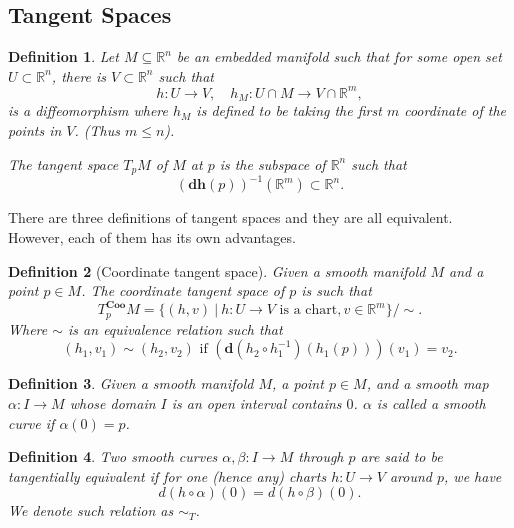 \documentclass{article}
\newtheorem{definition}{Definition}[section]
\numberwithin{equation}{section}
\begin{document}
\subsection{Tangent Spaces}

\begin{definition}
Let $M\subseteq \mathbb{R}^n$ be an embedded manifold such that for some open set $U\subset\mathbb{R}^n$, there is $V\subset\mathbb{R}^n$ such that
\begin{equation*}
h:U\to V, \quad h_M:U\cap M\to V\cap \mathbb{R}^m,
\end{equation*}
is a diffeomorphism where $h_M$ is defined to be taking the first $m$ coordinate of the points in $V$. (Thus $m\leq n$).\\
\par The tangent space $T_pM$ of $M$ at $p$ is the subspace of $\mathbb{R}^n$ such that
\begin{equation*}
(\mathbf{dh}(p))^{-1}(\mathbb{R}^m)\subset\mathbb{R}^n.
\end{equation*}
\end{definition}

There are three definitions of tangent spaces and they are all equivalent. However, each of them has its own advantages. 

\begin{definition}[Coordinate tangent space]
Given a smooth manifold $M$ and a point $p\in M$. The coordinate tangent space of $p$ is such that
\begin{equation*}
T_p^{\mathbf{Coo}}M = \{(h,v)\:|\: h:U\to V\text{ is a chart}, v\in\mathbb{R}^m\}/\sim.
\end{equation*}
Where $\sim$ is an equivalence relation such that
\begin{equation*}
(h_1,v_1)\sim (h_2,v_2)\text{ if } (\mathbf{d}(h_2\circ h_1^{-1})(h_1(p)))(v_1) = v_2.
\end{equation*}
\end{definition}

\begin{definition}
Given a smooth manifold $M$, a point $p\in M$, and a smooth map $\alpha:I\to M$ whose domain $I$ is an open interval contains $0$. $\alpha$ is called a smooth curve if $\alpha(0)=p$.
\end{definition}

\begin{definition}
Two smooth curves $\alpha,\beta:I\to M$ through $p$ are said to be tangentially equivalent if for one (hence any) charts $h:U\to V$ around $p$, we have 
\begin{equation*}
d(h\circ\alpha)(0) = d(h\circ\beta)(0).
\end{equation*}
We denote such relation as $\sim_T$.
\end{definition}
\end{document}

